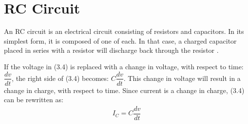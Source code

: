 \section{RC Circuit}
An RC circuit is an electrical circuit consisting of resistors and capacitors. In its simplest form, it is composed of one of each. In that case, a charged capacitor placed in series with a resistor will discharge back through the resistor \cite[p~21]{artof}. 

\begin{figure}[H]
 
\end{figure}

If the voltage in (3.4) is replaced with a change in voltage, with respect to time: $\dfrac{dv}{dt}$, the right side of (3.4) becomes: $C\dfrac{dv}{dt}$. This change in voltage will result in a change in charge, with respect to time. Since current is a change in charge, (3.4) can be rewritten as:
\begin{align}\label{I_C}
I_{C}= C \dfrac{dv}{dt}
\end{align}
